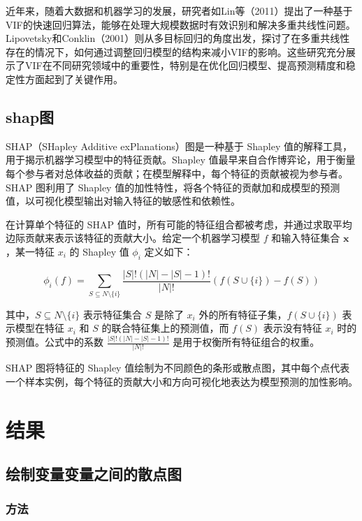 \documentclass[AutoFakeBold]{LZUThesis-PgD&PhD}
\begin{document}
	近年来，随着大数据和机器学习的发展，研究者如Lin等（2011）提出了一种基于VIF的快速回归算法，能够在处理大规模数据时有效识别和解决多重共线性问题\cite{lin2011}。Lipovetsky和Conklin（2001）则从多目标回归的角度出发，探讨了在多重共线性存在的情况下，如何通过调整回归模型的结构来减小VIF的影响\cite{lipovetsky2001}。这些研究充分展示了VIF在不同研究领域中的重要性，特别是在优化回归模型、提高预测精度和稳定性方面起到了关键作用。
	
\section{shap图}




SHAP（SHapley Additive exPlanations）图是一种基于 Shapley 值的解释工具，用于揭示机器学习模型中的特征贡献。Shapley 值最早来自合作博弈论，用于衡量每个参与者对总体收益的贡献；在模型解释中，每个特征的贡献被视为参与者。SHAP 图利用了 Shapley 值的加性特性，将各个特征的贡献加和成模型的预测值，以可视化模型输出对输入特征的敏感性和依赖性。

在计算单个特征的 SHAP 值时，所有可能的特征组合都被考虑，并通过求取平均边际贡献来表示该特征的贡献大小。给定一个机器学习模型 \( f \) 和输入特征集合 \( \mathbf{x} \)，某一特征 \( x_i \) 的 Shapley 值 \( \phi_i \) 定义如下：

\[
\phi_i(f) = \sum_{S \subseteq N \setminus \{i\}} \frac{|S|! (|N| - |S| - 1)!}{|N|!} \left( f(S \cup \{i\}) - f(S) \right)
\]

其中，\( S \subseteq N \setminus \{i\} \) 表示特征集合 \( S \) 是除了 \( x_i \) 外的所有特征子集，\( f(S \cup \{i\}) \) 表示模型在特征 \( x_i \) 和 \( S \) 的联合特征集上的预测值，而 \( f(S) \) 表示没有特征 \( x_i \) 时的预测值。公式中的系数 \( \frac{|S|! (|N| - |S| - 1)!}{|N|!} \) 是用于权衡所有特征组合的权重。

SHAP 图将特征的 Shapley 值绘制为不同颜色的条形或散点图，其中每个点代表一个样本实例，每个特征的贡献大小和方向可视化地表达为模型预测的加性影响。
\chapter{结果}

\section{绘制变量变量之间的散点图}
	
	
\subsection{方法}
\end{document}
